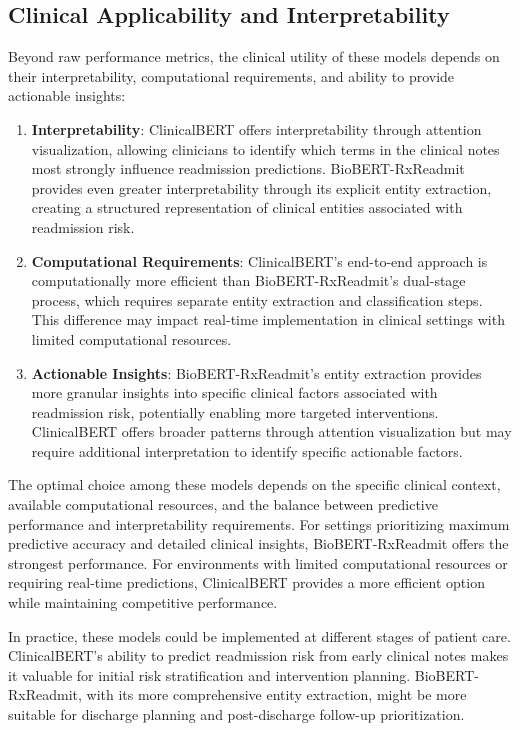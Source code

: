 \documentclass[3p,times,procedia]{elsarticle}
\begin{document}
\subsection{Clinical Applicability and Interpretability}

Beyond raw performance metrics, the clinical utility of these models depends on their interpretability, computational requirements, and ability to provide actionable insights:

\begin{enumerate}
    \item \textbf{Interpretability}: ClinicalBERT offers interpretability through attention visualization, allowing clinicians to identify which terms in the clinical notes most strongly influence readmission predictions. BioBERT-RxReadmit provides even greater interpretability through its explicit entity extraction, creating a structured representation of clinical entities associated with readmission risk.
    
    \item \textbf{Computational Requirements}: ClinicalBERT's end-to-end approach is computationally more efficient than BioBERT-RxReadmit's dual-stage process, which requires separate entity extraction and classification steps. This difference may impact real-time implementation in clinical settings with limited computational resources.
    
    \item \textbf{Actionable Insights}: BioBERT-RxReadmit's entity extraction provides more granular insights into specific clinical factors associated with readmission risk, potentially enabling more targeted interventions. ClinicalBERT offers broader patterns through attention visualization but may require additional interpretation to identify specific actionable factors.
\end{enumerate}

The optimal choice among these models depends on the specific clinical context, available computational resources, and the balance between predictive performance and interpretability requirements. For settings prioritizing maximum predictive accuracy and detailed clinical insights, BioBERT-RxReadmit offers the strongest performance. For environments with limited computational resources or requiring real-time predictions, ClinicalBERT provides a more efficient option while maintaining competitive performance.

In practice, these models could be implemented at different stages of patient care. ClinicalBERT's ability to predict readmission risk from early clinical notes makes it valuable for initial risk stratification and intervention planning. BioBERT-RxReadmit, with its more comprehensive entity extraction, might be more suitable for discharge planning and post-discharge follow-up prioritization.
\end{document}
